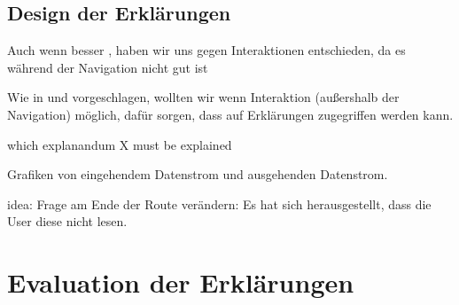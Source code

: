 \subsection{Design der Erklärungen}


Auch wenn besser \cite{riveiro_thats_2021}, haben wir uns gegen Interaktionen entschieden, da es während der Navigation nicht gut ist

Wie in \cite{chazette_end-users_nodate} und \cite{wang_integration_2020} vorgeschlagen, wollten wir wenn Interaktion (außershalb der Navigation) möglich, dafür sorgen, dass auf Erklärungen zugegriffen werden kann.

which explanandum X must be explained \cite{kohl_explainability_2019}

Grafiken von eingehendem Datenstrom und ausgehenden Datenstrom.

idea: Frage am Ende der Route verändern: Es hat sich herausgestellt, dass die User diese nicht lesen.

\section{Evaluation der Erklärungen}





